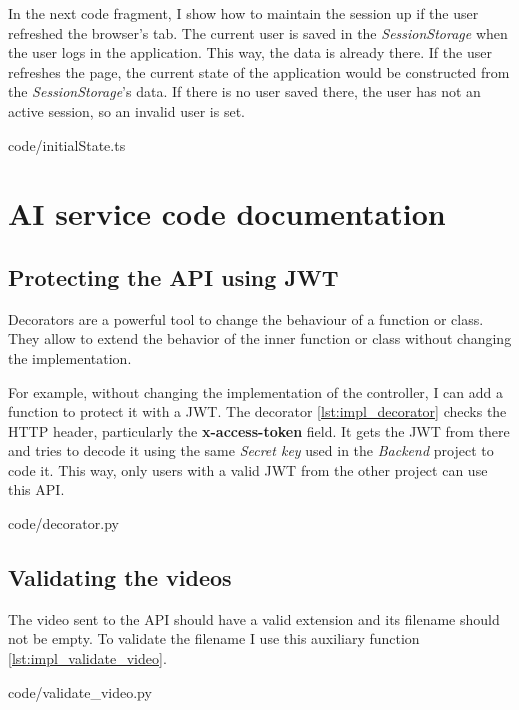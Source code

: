         In the next code fragment, I show how to maintain the session up if the user refreshed the browser's tab. 
        The current user is saved in the \textit{SessionStorage} when the user logs in the application. 
        This way, the data is already there. If the user refreshes the page, the current state of the application would be constructed 
        from the \textit{SessionStorage}'s data. If there is no user saved there, the user has not an active session, so an invalid user is set.
        
        {code/initialState.ts}

\newpage
\section{AI service code documentation}
    \subsection{Protecting the API using JWT}
        Decorators \cite{Decorator} are a powerful tool to change the behaviour of a function or class.
        They allow to extend the behavior of the inner function or class without changing the implementation.

        For example, without changing the implementation of the controller, I can add a function to protect it with a JWT.
        The decorator \ref{lst:impl_decorator} checks the HTTP header, particularly the \textbf{x-access-token} field. It gets the JWT from there and
        tries to decode it using the same \textit{Secret key} used in the \textit{Backend} project to code it. This way, only
        users with a valid JWT from the other project can use this API.
        
        {code/decorator.py}

    \subsection{Validating the videos}
        The video sent to the API should have a valid extension and its filename should not be empty.
        To validate the filename I use this auxiliary function \ref{lst:impl_validate_video}. 
        
        {code/validate_video.py}

